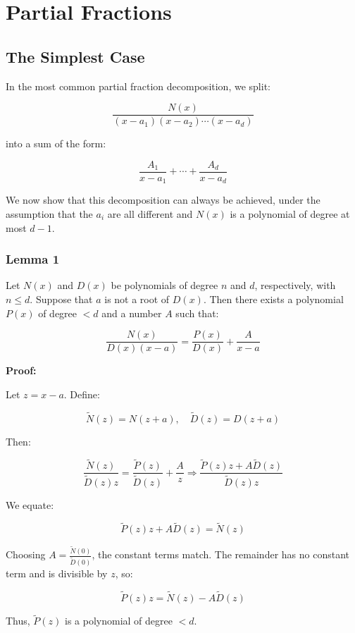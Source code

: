 \newpage
\section{Partial Fractions}

\subsection{The Simplest Case}

In the most common partial fraction decomposition, we split:

\[
    \frac{N(x)}{(x - a_1)(x - a_2)\cdots(x - a_d)}
\]

into a sum of the form:

\[
    \frac{A_1}{x - a_1} + \cdots + \frac{A_d}{x - a_d}
\]

We now show that this decomposition can always be achieved, under the assumption that the \(a_i\) are all different and \(N(x)\) is a polynomial of degree at most \(d - 1\).

\subsubsection{Lemma 1}

Let \(N(x)\) and \(D(x)\) be polynomials of degree \(n\) and \(d\), respectively, with \(n \leq d\). 
Suppose that \(a\) is not a root of \(D(x)\). Then there exists a polynomial \(P(x)\) of degree \(< d\) and a number \(A\) such that:

\[
    \frac{N(x)}{D(x)(x - a)} = \frac{P(x)}{D(x)} + \frac{A}{x - a}
\]

\textbf{Proof:} 

Let \(z = x - a\). Define:

\[
    \tilde{N}(z) = N(z + a), \quad \tilde{D}(z) = D(z + a)
\]

Then:

\[
    \frac{\tilde{N}(z)}{\tilde{D}(z)z} = \frac{\tilde{P}(z)}{\tilde{D}(z)} + \frac{A}{z}
    \Rightarrow \frac{\tilde{P}(z)z + A\tilde{D}(z)}{\tilde{D}(z)z}
\]

We equate:

\[
    \tilde{P}(z)z + A\tilde{D}(z) = \tilde{N}(z)
\]

Choosing \(A = \frac{\tilde{N}(0)}{\tilde{D}(0)}\), the constant terms match. The remainder has no constant term and is divisible by \(z\), so:

\[
    \tilde{P}(z)z = \tilde{N}(z) - A\tilde{D}(z)
\]

Thus, \(\tilde{P}(z)\) is a polynomial of degree \(< d\).

